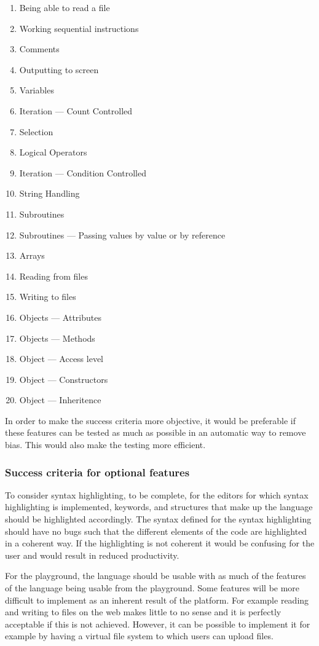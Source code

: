 \documentclass{article}
\begin{document}
\begin{enumerate}
	\item Being able to read a file
	\item Working sequential instructions
	\item Comments
	\item Outputting to screen
	\item Variables
	\item Iteration --- Count Controlled
	\item Selection
	\item Logical Operators
	\item Iteration --- Condition Controlled
	\item String Handling
	\item Subroutines
	\item Subroutines --- Passing values by value or by reference
	\item Arrays
	\item Reading from files
	\item Writing to files
	\item Objects --- Attributes
	\item Objects --- Methods
	\item Object --- Access level
	\item Object --- Constructors
	\item Object --- Inheritence
\end{enumerate}

In order to make the success criteria more objective, it would be preferable if
these features can be tested as much as possible in an automatic way to remove
bias. This would also make the testing more efficient.

\subsubsection{Success criteria for optional features}

To consider syntax highlighting, to be complete, for the editors for which syntax
highlighting is implemented, keywords, and structures that make up the language
should be highlighted accordingly. The syntax defined for the syntax
highlighting should have no bugs such that the different elements of the code
are highlighted in a coherent way. If the highlighting is not coherent it would
be confusing for the user and would result in reduced productivity.

For the playground, the language should be usable with as much of the features
of the language being usable from the playground. Some features will be more
difficult to implement as an inherent result of the platform. For example
reading and writing to files on the web makes little to no sense and it is
perfectly acceptable if this is not achieved. However, it can be possible to
implement it for example by having a virtual file system to which users can
upload files.
\end{document}

